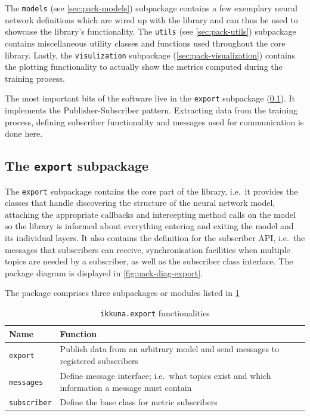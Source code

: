 The \texttt{models} (see \cref{sec:pack-models})
subpackage contains a few exemplary neural network definitions which are
wired up with the library and can thus be used to showcase the library's
functionality. The \texttt{utils} (see
\cref{sec:pack-utils}) subpackage contains miscellaneous utility classes
and functions used throughout the core library. Lastly, the
\texttt{visulization} subpackage
(\cref{sec:pack-visualization}) contains the plotting functionality to
actually show the metrics computed during the training process.

The most important bits of the software live in the
\texttt{export} subpackage (\cref{sec:pack-export}). It
implements the Publisher-Subscriber pattern. Extracting data from the
training process, defining subscriber functionality and messages used
for communication is done here.

\hypertarget{sec:pack-export}{%
\subsection{The \texttt{export} subpackage}\label{sec:pack-export}}

The \texttt{export} subpackage contains the core part
of the library, i.e.~it provides the classes that handle discovering the
structure of the neural network model, attaching the appropriate
callbacks and intercepting method calls on the model so the library is
informed about everything entering and exiting the model and its
individual layers. It also contains the definition for the subscriber
API, i.e.~the messages that subscribers can receive, synchronisation
facilities when multiple topics are needed by a subscriber, as well as
the subscriber class interface. The package diagram is displayed in
\cref{fig:pack-diag-export}.

The package comprises three subpackages or modules listed in
\cref{tbl:ikkuna.export}

\begin{table}
    \caption{\texttt{ikkuna.export} functionalities}
    \label{tbl:ikkuna.export}
    \begin{tabularx}{\textwidth}{lX}
        \toprule
        Name                & Function\tabularnewline
        \midrule
        \texttt{export}     & Publish data from an arbitrary model and send messages to registered subscribers\tabularnewline
        \texttt{messages}   & Define message interface; i.e.~what topics exist and which information a message must contain\tabularnewline
        \texttt{subscriber} & Define the base class for metric subscribers\tabularnewline
        \bottomrule
    \end{tabularx}
\end{table}

